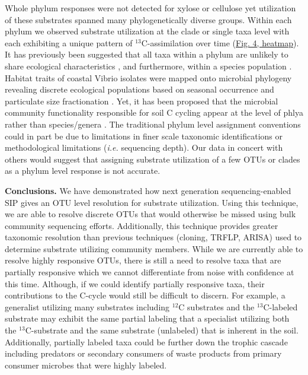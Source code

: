 Whole phylum responses were not detected for xylose or cellulose yet
utilization of these substrates spanned many phylogenetically diverse groups.
Within each phylum we observed substrate utilization at the clade or single
taxa level with each exhibiting a unique pattern of
$^{13}$C-assimilation over time
(\href{https://authorea.com/users/3537/articles/3612/master/file/figures/bacteria_tree/bacteria_tree.png}{Fig.
4, heatmap}). It has previously been suggested that all taxa within a phylum
are unlikely to share ecological characteristics \citep{Fierer_2007}, and
furthermore, within a species population
\citep{Choudoir_2012,Preheim_2011,Hunt_2008}. Habitat traits of coastal Vibrio
isolates were mapped onto microbial phylogeny revealing discrete ecological
populations based on seasonal occurrence and particulate size fractionation
\citep{Preheim_2011,Hunt_2008}. Yet, it has been proposed that the microbial
community functionality responsible for soil C cycling appear at the level of
phlya rather than species/genera \citep{Schimel_2012}. The traditional phylum
level assignment conventions could in part be due to limitations in finer scale
taxonomic identifications or methodological limitations (\textit{i.e.}
sequencing depth). Our data in concert with others
\citep{Goldfarb_2011,Fierer_2007,Choudoir_2012,Preheim_2011,Hunt_2008} would
suggest that assigning substrate utilization of a few OTUs or clades as a
phylum level response is not accurate.

\textbf{Conclusions.} We have demonstrated how next generation
sequencing-enabled SIP gives an OTU level resolution for substrate utilization.
Using this technique, we are able to resolve discrete OTUs that would otherwise
be missed using bulk community sequencing efforts. Additionally, this technique
provides greater taxonomic resolution than previous techniques (cloning, TRFLP,
ARISA) used to determine substrate utilizing community members. While we are
currently able to resolve highly responsive OTUs, there is still a need to
resolve taxa that are partially responsive which we cannot differentiate from
noise with confidence at this time. Although, if we could identify partially
responsive taxa, their contributions to the C-cycle would still be difficult to
discern. For example, a generalist utilizing many substrates including
$^{12}$C substrates and the $^{13}$C-labeled
substrate may exhibit the same partial labeling that a specialist utilizing
both the $^{13}$C-substrate and the same substrate (unlabeled)
that is inherent in the soil. Additionally, partially labeled taxa could be
further down the trophic cascade including predators or secondary consumers of
waste products from primary consumer microbes that were highly labeled.   

